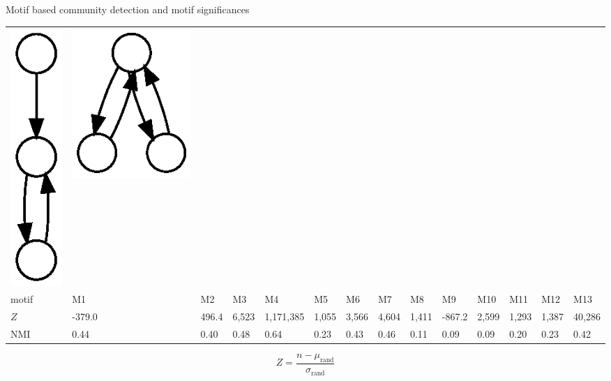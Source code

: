 \documentclass[unknownkeysallowed]{beamer}
\begin{document}
\begin{frame}{Motif based community detection and motif significances}
\begin{tabular}{l|lllllllllllll}
    \includegraphics[height=0.10\textheight]{M12-plain} &
    \includegraphics[height=0.10\textheight]{M13-plain} \\
    motif & M1 & M2 & M3 & M4 & M5 & M6 & M7 & M8 & M9 & M10 & M11 & M12 & M13
    \\ \hline
    $Z$ & -379.0 & 496.4 & 6,523 & 1,171,385 & 1,055 & 3,566 & 4,604 & 1,411 &
    -867.2 & 2,599 & 1,293 & 1,387 & 40,286 \\
    NMI & 0.44 & 0.40 & 0.48 & 0.64 & 0.23 & 0.43 & 0.46 & 0.11 & 0.09 & 0.09 &
    0.20 & 0.23 & 0.42
  \end{tabular}

  \begin{equation*}
    Z = \frac{n - \mu_{\mathrm{rand}}}{\sigma_{\mathrm{rand}}}
  \end{equation*}
\end{frame}
\end{document}
